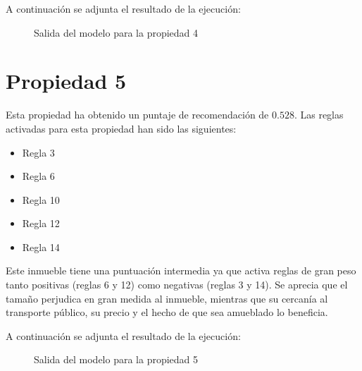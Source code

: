 \documentclass[12pt]{report} %
\begin{document}
    A continuación se adjunta el resultado de la ejecución:
    \begin{figure}[H]
        \centering
        \caption{Salida del modelo para la propiedad 4}
    \end{figure}

    \section{Propiedad 5}
    Esta propiedad ha obtenido un puntaje de recomendación de $0.528$. Las reglas activadas para esta propiedad han sido las siguientes:
    \begin{itemize}
        \item Regla 3
        \item Regla 6
        \item Regla 10
        \item Regla 12
        \item Regla 14
    \end{itemize}

    Este inmueble tiene una puntuación intermedia ya que activa reglas de
    gran peso tanto positivas (reglas 6 y 12) como negativas (reglas 3 y 14).
    Se aprecia que el tamaño perjudica en gran medida al inmueble, mientras que
    su cercanía al transporte público, su precio y el hecho de que sea
    amueblado lo beneficia.

    A continuación se adjunta el resultado de la ejecución:
    \begin{figure}[H]
        \centering
        \caption{Salida del modelo para la propiedad 5}
    \end{figure}
     
\end{document}
